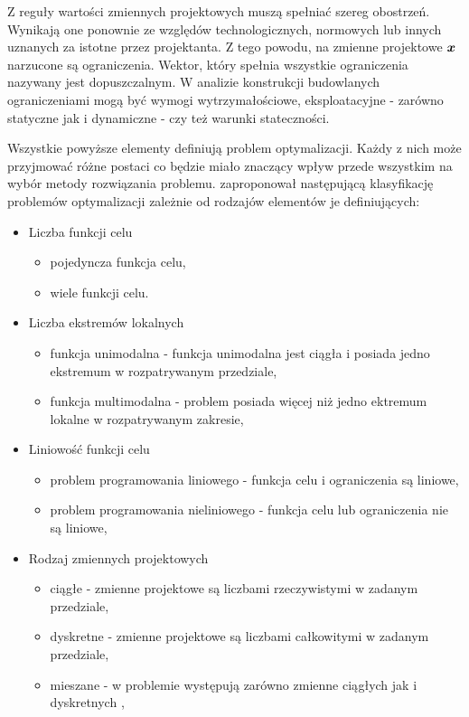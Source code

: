 Z reguły wartości zmiennych projektowych muszą spełniać szereg obostrzeń. Wynikają one ponownie ze względów technologicznych, normowych lub innych uznanych za istotne przez projektanta. Z tego powodu, na zmienne projektowe $\bm{x}$ narzucone są ograniczenia. Wektor, który spełnia wszystkie ograniczenia nazywany jest dopuszczalnym. W analizie konstrukcji budowlanych ograniczeniami mogą być wymogi wytrzymałościowe, eksploatacyjne - zarówno statyczne jak i dynamiczne - czy też warunki stateczności. 

Wszystkie powyższe elementy definiują problem optymalizacji. Każdy z nich może przyjmować różne postaci co będzie miało znaczący wpływ przede wszystkim na wybór metody rozwiązania problemu. \cite{Tesch2016} zaproponował następującą klasyfikację problemów optymalizacji zależnie od rodzajów elementów je definiujących:
\begin{itemize}[noitemsep]
	\item Liczba funkcji celu
	\begin{itemize}[noitemsep]
		\item pojedyncza funkcja celu,
		\item wiele funkcji celu.
	\end{itemize}
	\item Liczba ekstremów lokalnych
	\begin{itemize}[noitemsep]
		\item funkcja unimodalna - funkcja unimodalna jest ciągła i posiada jedno ekstremum w rozpatrywanym przedziale,
		\item funkcja multimodalna - problem posiada więcej niż jedno ektremum lokalne w rozpatrywanym zakresie,
	\end{itemize}
	\item Liniowość funkcji celu
	\begin{itemize}[noitemsep]
		\item problem programowania liniowego - funkcja celu i ograniczenia są liniowe,
		\item problem programowania nieliniowego - funkcja celu lub ograniczenia nie są liniowe,
	\end{itemize}
	\item Rodzaj zmiennych projektowych
	\begin{itemize}[noitemsep]
		\item ciągłe - zmienne projektowe są liczbami rzeczywistymi w zadanym przedziale,
		\item dyskretne - zmienne projektowe są liczbami całkowitymi w zadanym przedziale,
		\item mieszane - w problemie występują zarówno zmienne ciągłych jak i dyskretnych ,
	\end{itemize}
\end{itemize}

